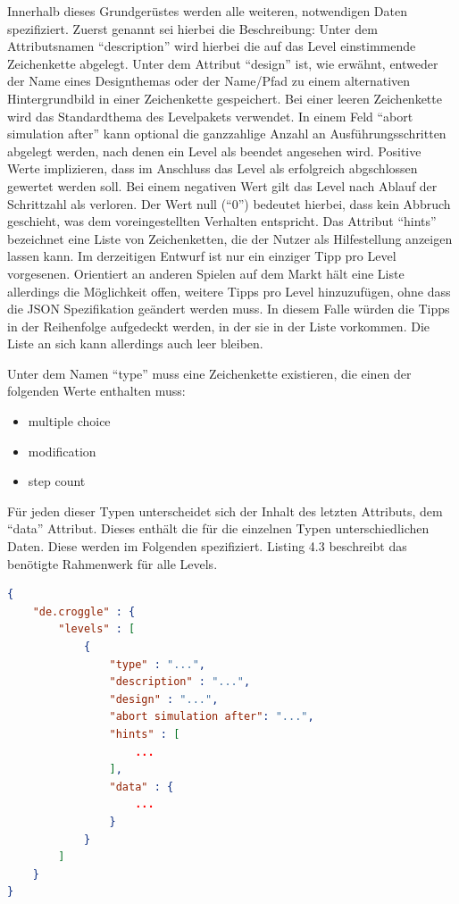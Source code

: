 Innerhalb dieses Grundgerüstes werden alle weiteren, notwendigen Daten spezifiziert.
Zuerst genannt sei hierbei die Beschreibung: Unter dem Attributsnamen "`description"' wird hierbei die auf das Level einstimmende Zeichenkette abgelegt.
Unter dem Attribut "`design"' ist, wie erwähnt, entweder der Name eines Designthemas oder der Name/Pfad zu einem alternativen Hintergrundbild in einer Zeichenkette gespeichert.
Bei einer leeren Zeichenkette wird das Standardthema des Levelpakets verwendet.
In einem Feld "`abort simulation after"' kann optional die ganzzahlige Anzahl an Ausführungsschritten abgelegt werden, nach denen ein Level als beendet angesehen wird.
Positive Werte implizieren, dass im Anschluss das Level als erfolgreich abgschlossen gewertet werden soll.
Bei einem negativen Wert gilt das Level nach Ablauf der Schrittzahl als verloren.
Der Wert null ("`0"') bedeutet hierbei, dass kein Abbruch geschieht, was dem voreingestellten Verhalten entspricht.
Das Attribut "`hints"' bezeichnet eine Liste von Zeichenketten, die der Nutzer als Hilfestellung anzeigen lassen kann.
Im derzeitigen Entwurf ist nur ein einziger Tipp pro Level vorgesenen.
Orientiert an anderen Spielen auf dem Markt hält eine Liste allerdings die Möglichkeit offen, weitere Tipps pro Level hinzuzufügen, ohne dass die JSON Spezifikation geändert werden muss.
In diesem Falle würden die Tipps in der Reihenfolge aufgedeckt werden, in der sie in der Liste vorkommen.
Die Liste an sich kann allerdings auch leer bleiben.

Unter dem Namen "`type"' muss eine Zeichenkette existieren, die einen der folgenden Werte enthalten muss:
\begin{itemize}
	\item multiple choice
	\item modification
	\item step count
\end{itemize}

Für jeden dieser Typen unterscheidet sich der Inhalt des letzten Attributs, dem "`data"' Attribut.
Dieses enthält die für die einzelnen Typen unterschiedlichen Daten.
Diese werden im Folgenden spezifiziert.
Listing 4.3 beschreibt das benötigte Rahmenwerk für alle Levels.
\begin{lstlisting}[language=json,caption={JSON Leveldatei, z.B. json/00/00.json}]
{
	"de.croggle" : {
		"levels" : [
			{
				"type" : "...",
				"description" : "...",
				"design" : "...",
				"abort simulation after": "...",
				"hints" : [
					...
				],
				"data" : {
					...
				}
			}
		]
	}
}
\end{lstlisting}

